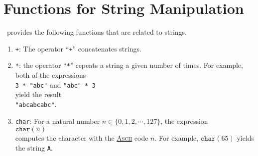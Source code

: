 \section{Functions for String Manipulation}
\setlx\ provides the following functions that are related to strings.
\begin{enumerate}
\item \texttt{+}:  The operator ``\texttt{+}'' concatenates strings.
\item \texttt{*}:  the operator ``\texttt{*}'' repeats a string a given number of times.
      For example, both of the expressions
      \\[0.2cm]
      \hspace*{1.3cm}
      \texttt{3 * "abc"} \quad and \quad \texttt{"abc" * 3}
      \\[0.2cm]
      yield the result 
      \\[0.2cm]
      \hspace*{1.3cm}
      \texttt{"abcabcabc"}.
\item \texttt{char}:  For a natural number $n \in \{ 0, 1, 2, \cdots, 127 \}$,  the expression
      \\[0.2cm]
      \hspace*{1.3cm}
      $\mathtt{char}(n)$
      \\[0.2cm]
      computes the character with the 
      \href{https://en.wikipedia.org/wiki/ASCII}{\textsc{Ascii}} code $n$.  For example,
      $\mathtt{char}(65)$ yields the string \texttt{A}.


\end{enumerate}
